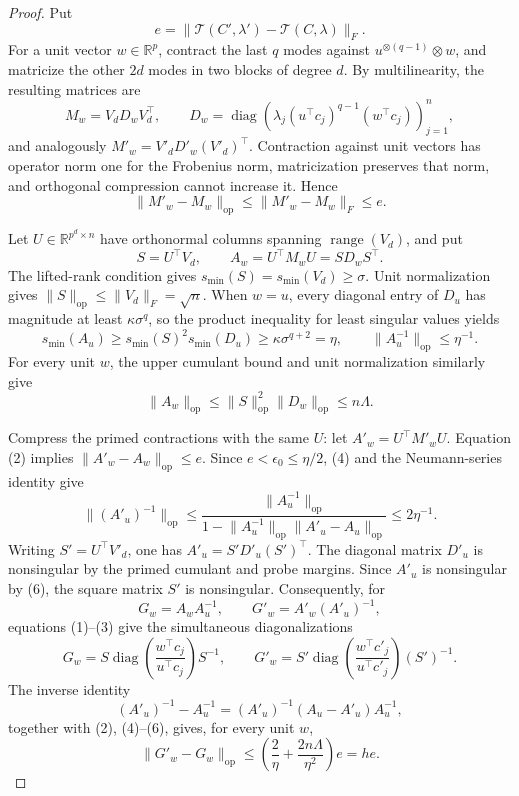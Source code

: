 \documentclass{article}
\begin{document}
\begin{proof}
Put
\[
 e=\lVert\mathcal T(C',\lambda')-\mathcal T(C,\lambda)\rVert_F.
\]
For a unit vector \(w\in\mathbb R^p\), contract the last \(q\) modes against \(u^{\otimes(q-1)}\otimes w\), and matricize the other \(2d\) modes in two blocks of degree \(d\). By multilinearity, the resulting matrices are
\[
 M_w=V_dD_wV_d^\top,
 \qquad
 D_w=\operatorname{diag}\!\left(
 \lambda_j(u^\top c_j)^{q-1}(w^\top c_j)
 \right)_{j=1}^n,
 \tag{1}
\]
and analogously \(M'_w=V'_dD'_w(V'_d)^\top\). Contraction against unit vectors has operator norm one for the Frobenius norm, matricization preserves that norm, and orthogonal compression cannot increase it. Hence
\[
 \lVert M'_w-M_w\rVert_{\mathrm{op}}
 \le \lVert M'_w-M_w\rVert_F\le e.
 \tag{2}
\]

Let \(U\in\mathbb R^{p^d\times n}\) have orthonormal columns spanning \(\operatorname{range}(V_d)\), and put
\[
 S=U^\top V_d,
 \qquad
 A_w=U^\top M_wU=SD_wS^\top.
 \tag{3}
\]
The lifted-rank condition gives \(s_{\min}(S)=s_{\min}(V_d)\ge\sigma\). Unit normalization gives \(\lVert S\rVert_{\mathrm{op}}\le\lVert V_d\rVert_F=\sqrt n\). When \(w=u\), every diagonal entry of \(D_u\) has magnitude at least \(\kappa\sigma^q\), so the product inequality for least singular values yields
\[
 s_{\min}(A_u)
 \ge s_{\min}(S)^2s_{\min}(D_u)
 \ge\kappa\sigma^{q+2}=\eta,
 \qquad
 \lVert A_u^{-1}\rVert_{\mathrm{op}}\le\eta^{-1}.
 \tag{4}
\]
For every unit \(w\), the upper cumulant bound and unit normalization similarly give
\[
 \lVert A_w\rVert_{\mathrm{op}}
 \le \lVert S\rVert_{\mathrm{op}}^2\lVert D_w\rVert_{\mathrm{op}}
 \le n\Lambda.
 \tag{5}
\]

Compress the primed contractions with the same \(U\): let \(A'_w=U^\top M'_wU\). Equation (2) implies \(\lVert A'_w-A_w\rVert_{\mathrm{op}}\le e\). Since \(e<\epsilon_0\le\eta/2\), (4) and the Neumann-series identity give
\[
 \lVert(A'_u)^{-1}\rVert_{\mathrm{op}}
 \le\frac{\lVert A_u^{-1}\rVert_{\mathrm{op}}}
 {1-\lVert A_u^{-1}\rVert_{\mathrm{op}}\lVert A'_u-A_u\rVert_{\mathrm{op}}}
 \le2\eta^{-1}.
 \tag{6}
\]
Writing \(S'=U^\top V'_d\), one has \(A'_u=S'D'_u(S')^\top\). The diagonal matrix \(D'_u\) is nonsingular by the primed cumulant and probe margins. Since \(A'_u\) is nonsingular by (6), the square matrix \(S'\) is nonsingular. Consequently, for
\[
 G_w=A_wA_u^{-1},
 \qquad
 G'_w=A'_w(A'_u)^{-1},
\]
equations (1)--(3) give the simultaneous diagonalizations
\[
 G_w=S\operatorname{diag}\!\left(\frac{w^\top c_j}{u^\top c_j}\right)S^{-1},
 \qquad
 G'_w=S'\operatorname{diag}\!\left(\frac{w^\top c'_j}{u^\top c'_j}\right)(S')^{-1}.
 \tag{7}
\]
The inverse identity
\[
 (A'_u)^{-1}-A_u^{-1}
 =(A'_u)^{-1}(A_u-A'_u)A_u^{-1},
\]
together with (2), (4)--(6), gives, for every unit \(w\),
\[
 \lVert G'_w-G_w\rVert_{\mathrm{op}}
 \le\left(\frac2\eta+\frac{2n\Lambda}{\eta^2}\right)e
 =he.
 \tag{8}
\]


\end{proof}
\end{document}
